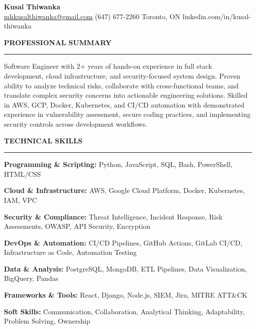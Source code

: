 \documentclass[10pt,letterpaper]{article}
\begin{document}
\begin{center}
{\LARGE\textbf{Kusal Thiwanka}}\\[3pt]
\href{mailto:mhkusalthiwanka@gmail.com}{mhkusalthiwanka@gmail.com}\hspace{2em}%
(647) 677{-}2260\hspace{2em}%
Toronto, ON\hspace{2em}
linkedin.com/in/kusal-thiwanka
\end{center}

\vspace{6pt}

\textbf{PROFESSIONAL SUMMARY}\\[-8pt]
\noindent\rule{\textwidth}{1pt}

\vspace{-2pt}

Software Engineer with 2+ years of hands-on experience in full stack development, cloud infrastructure, and security-focused system design. Proven ability to analyze technical risks, collaborate with cross-functional teams, and translate complex security concerns into actionable engineering solutions. Skilled in AWS, GCP, Docker, Kubernetes, and CI/CD automation with demonstrated experience in vulnerability assessment, secure coding practices, and implementing security controls across development workflows.

\vspace{8pt}

\textbf{TECHNICAL SKILLS}\\[-8pt]
\noindent\rule{\textwidth}{1pt}

\vspace{-2pt}

\textbf{Programming \& Scripting:} Python, JavaScript, SQL, Bash, PowerShell, HTML/CSS

\textbf{Cloud \& Infrastructure:} AWS, Google Cloud Platform, Docker, Kubernetes, IAM, VPC

\textbf{Security \& Compliance:} Threat Intelligence, Incident Response, Risk Assessments, OWASP, API Security, Encryption

\textbf{DevOps \& Automation:} CI/CD Pipelines, GitHub Actions, GitLab CI/CD, Infrastructure as Code, Automation Testing

\textbf{Data \& Analysis:} PostgreSQL, MongoDB, ETL Pipelines, Data Visualization, BigQuery, Pandas

\textbf{Frameworks \& Tools:} React, Django, Node.js, SIEM, Jira, MITRE ATT\&CK

\textbf{Soft Skills:} Communication, Collaboration, Analytical Thinking, Adaptability, Problem Solving, Ownership
\end{document}
